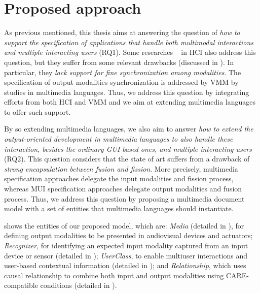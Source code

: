 \chapter{Proposed approach}
\label{chp:approach}

As previous mentioned, this thesis aims at answering the question of\textit{ how
to support the specification of applications that handle both multimodal
interactions and multiple interacting users} (RQ1). Some researches
~\cite{dumas_description_2010, katsurada_xisl:_2005, w3c_multimodal_2003} in HCI
also address this question, but they suffer from some relevant drawbacks
(discussed in ). In particular, they \textit{lack
support for fine
synchronization among modalities}. The specification of output modalities
synchronization is addressed by VMM by studies in multimedia languages. Thus, we
address this question by integrating efforts from both HCI and VMM and we aim at
extending multimedia languages to offer such support.

By so extending multimedia languages, we also aim to answer \textit{how to
extend the output-oriented development in multimedia languages to also handle
these interaction, besides the ordinary GUI-based ones, and multiple interacting
users} (RQ2). This question considers that the state of art suffers from a
drawback of \textit{strong encapsulation between fusion and fission}. More
precisely, multimedia specification approaches delegate the input modalities and
fission process, whereas MUI specification approaches delegate output modalities
and fusion process. Thus, we address this question by proposing a multimedia
document model with a set of entities that multimedia languages should
instantiate.

 shows the entities of our proposed model, which are:
\textit{Media} (detailed in ), for defining output
modalities to be presented in audiovisual devices and actuators;
\textit{Recognizer}, for identifying an expected input modality captured from an
input device or sensor (detailed in );
\textit{UserClass}, to enable multiuser interactions and user-based contextual
information (detailed in ); and
\textit{Relationship}, which uses causal relationship to combine both input and
output modalities using CARE-compatible conditions (detailed in
).

